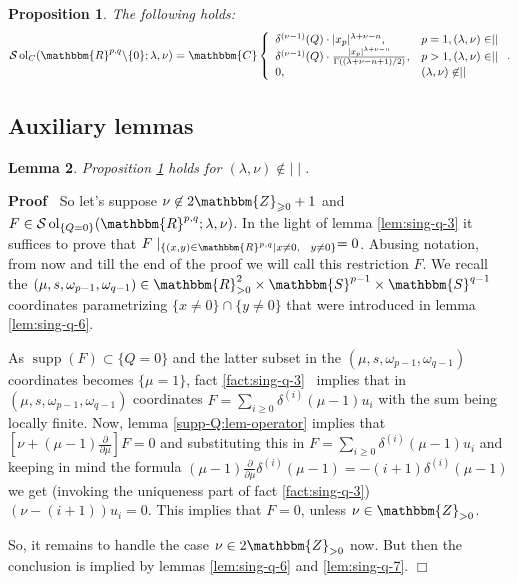 \documentclass{article}
\newcommand{\nin}{\not\in}
\newcommand{\tmop}[1]{\ensuremath{\operatorname{#1}}}
\renewenvironment{proof}{\noindent\textbf{Proof\ }}{\hspace*{\fill}$\Box$\medskip}
\newtheorem{proposition}{Proposition}[section]
\newtheorem{lemma}[proposition]{Lemma}
\theoremstyle{remark}
\newcommand{\supp}{\tmop{supp}}
\newcommand{\Z}{\mathbbm{Z}}
\newcommand{\R}{\mathbbm{R}}
\newcommand{\mysbra}[1]{\left[ #1 \right]}
\begin{document}
\begin{proposition}
  \label{sol-MO:prop-solCnonzero}The following holds:
  \[ \mathcal{S} \tmop{ol}_C (\mathbbm{R}^{p, q} \backslash \{ 0 \} ; \lambda,
     \nu) =\mathbbm{C} \left\{ \begin{array}{ll}
       \delta^{(\nu - 1)} (Q) \cdot | x_p |^{\lambda + \nu - n}, & p = 1,
       (\lambda, \nu) \in \mid \mid\\
       \delta^{(\nu - 1)} (Q) \cdot \frac{| x_p |^{\lambda + \nu - n}}{\Gamma
       ((\lambda + \nu - n + 1) / 2)}, & p > 1, (\lambda, \nu) \in \mid \mid\\
       0, & (\lambda, \nu) \nin \mid \mid
     \end{array} \right. . \]
\end{proposition}

\subsection{Auxiliary lemmas}

\begin{lemma}
  \label{uniq-c:lem-generic}Proposition \ref{sol-MO:prop-solCnonzero} holds
  for $(\lambda, \nu) \nin \mid \mid$.
\end{lemma}

\begin{proof}
  So let's suppose $\nu \nin 2\mathbbm{Z}_{\geqslant 0} + 1$ and $F \in
  \mathcal{S} \tmop{ol}_{\{ Q = 0 \}} (\mathbbm{R}^{p, q} ; \lambda, \nu)$. In
  the light of lemma \ref{lem:sing-q-3} it suffices to prove that $F
  \mid_{\{ (x, y) \in \R^{p, q} |x \neq 0, \hspace{0.75em} y \neq 0\}} =
  0$. Abusing notation, from now and till the end of the proof we will call
  this restriction $F$. We recall the $(\mu, s, \omega_{p - 1}, \omega_{q -
  1}) \in \mathbbm{R}_{> 0}^2 \times \mathbbm{S}^{p - 1} \times \mathbbm{S}^{q
  - 1}$ coordinates parametrizing $\{ x \neq 0 \} \cap \{ y \neq 0 \}$ that
  were introduced in lemma \ref{lem:sing-q-6}.
  
  As $\supp (F) \subset \{ Q = 0 \}$ and the latter subset in the $(\mu, s,
  \omega_{p - 1}, \omega_{q - 1})$ coordinates becomes $\{ \mu = 1 \}$, fact
  \ref{fact:sing-q-3} \ implies that in $(\mu, s, \omega_{p - 1}, \omega_{q -
  1})$ coordinates $F = \sum_{i \geq 0} \delta^{(i)}  (\mu - 1) u_i$ with the
  sum being locally finite. Now, lemma \ref{supp-Q:lem-operator} implies that
  $\mysbra{\nu + (\mu - 1)  \frac{\partial}{\partial \mu}} F = 0$ and
  substituting this in $F = \sum_{i \geq 0} \delta^{(i)}  (\mu - 1) u_i$ and
  keeping in mind the formula $(\mu - 1)  \frac{\partial}{\partial \mu}
  \delta^{(i)}  (\mu - 1) = - (i + 1) \delta^{(i)}  (\mu - 1)$ we get
  (invoking the uniqueness part of fact \ref{fact:sing-q-3}) $(\nu - (i + 1))
  u_i = 0$. This implies that $F = 0$, unless $\nu \in \Z_{> 0}$.
  
  So, it remains to handle the case $\nu \in 2\mathbbm{Z}_{> 0}$ now. But then
  the conclusion is implied by lemmas \ref{lem:sing-q-6} and
  \ref{lem:sing-q-7}.
\end{proof}
\end{document}
